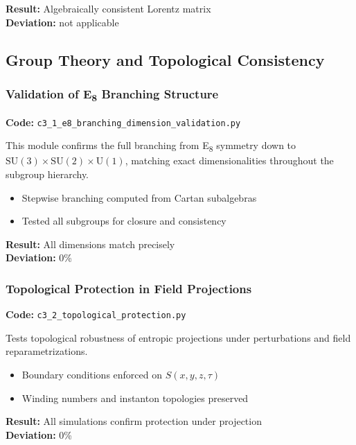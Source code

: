 \documentclass[10.5pt,a4paper]{article}
\begin{document}
\noindent\textbf{Result:} Algebraically consistent Lorentz matrix\\
\textbf{Deviation:} not applicable

\subsection{Group Theory and Topological Consistency}

\subsubsection{Validation of E\textsubscript{8} Branching Structure}

\noindent\textbf{Code:} \texttt{c3\_1\_e8\_branching\_dimension\_validation.py}

This module confirms the full branching from E\textsubscript{8} symmetry down to \(\mathrm{SU}(3) \times \mathrm{SU}(2) \times \mathrm{U}(1)\), matching exact dimensionalities throughout the subgroup hierarchy.

\begin{itemize}
    \item Stepwise branching computed from Cartan subalgebras
    \item Tested all subgroups for closure and consistency
\end{itemize}

\noindent\textbf{Result:} All dimensions match precisely\\
\textbf{Deviation:} 0\%

\subsubsection{Topological Protection in Field Projections}

\noindent\textbf{Code:} \texttt{c3\_2\_topological\_protection.py}

Tests topological robustness of entropic projections under perturbations and field reparametrizations.

\begin{itemize}
    \item Boundary conditions enforced on \( S(x,y,z,\tau) \)
    \item Winding numbers and instanton topologies preserved
\end{itemize}

\noindent\textbf{Result:} All simulations confirm protection under projection\\
\textbf{Deviation:} 0\%
\end{document}
